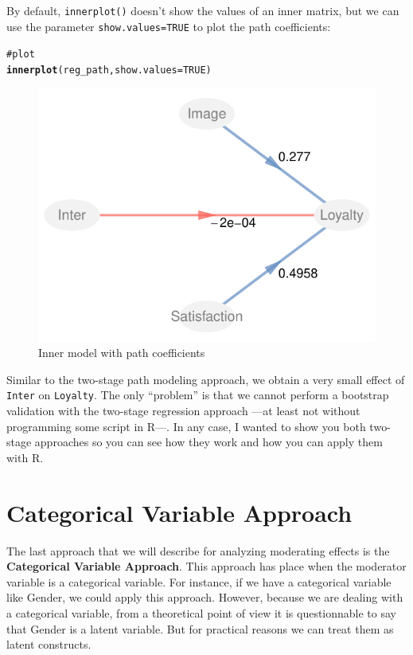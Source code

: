 \documentclass[12pt]{book}\usepackage{graphicx, color}
\makeatletter
\newcommand{\hlfunctioncall}[1]{\textcolor[rgb]{0.501960784313725,0,0.329411764705882}{\textbf{#1}}}%
\newcommand{\hlcomment}[1]{\textcolor[rgb]{0.180392156862745,0.6,0.341176470588235}{#1}}%
\newenvironment{kframe}{%
 \def\at@end@of@kframe{}%
 \ifinner\ifhmode%
  \def\at@end@of@kframe{\end{minipage}}%
  \begin{minipage}{\columnwidth}%
 \fi\fi%
 \def\FrameCommand##1{\hskip\@totalleftmargin \hskip-\fboxsep
 \colorbox{shadecolor}{##1}\hskip-\fboxsep
     \hskip-\linewidth \hskip-\@totalleftmargin \hskip\columnwidth}%
 \MakeFramed {\advance\hsize-\width
   \@totalleftmargin\z@ \linewidth\hsize
   \@setminipage}}%
 {\par\unskip\endMakeFramed%
 \at@end@of@kframe}
\newenvironment{knitrout}{}{} %
\newcommand{\code}[1]{\texttt{#1}}
\makeatother
\begin{document}
By default, \code{innerplot()} doesn't show the values of an inner matrix, but we can use the parameter \code{show.values=TRUE} to plot the path coefficients:
\begin{knitrout}
\color{fgcolor}\begin{kframe}
\begin{alltt}
\hlcomment{# plot}
\hlfunctioncall{innerplot}(reg_path, show.values = TRUE)
\end{alltt}
\end{kframe}\begin{figure}[h]


{\centering \includegraphics[width=.6\linewidth,height=.4\linewidth]{figure/TwoStageReg_path_diagram} 

}

\caption[Inner model with path coefficients]{Inner model with path coefficients\label{fig:TwoStageReg_path_diagram}}
\end{figure}


\end{knitrout}


Similar to the two-stage path modeling approach, we obtain a very small effect of \texttt{Inter} on \texttt{Loyalty}. The only ``problem'' is that we cannot perform a bootstrap validation with the two-stage regression approach ---at least not without programming some script in R---. In any case, I wanted to show you both two-stage approaches so you can see how they work and how you can apply them with R.




\section{Categorical Variable Approach}
The last approach that we will describe for analyzing moderating effects is the \textbf{Categorical Variable Approach}. This approach has place when the moderator variable is a categorical variable. For instance, if we have a categorical variable like Gender, we could apply this approach. However, because we are dealing with a categorical variable, from a theoretical point of view it is questionnable to say that Gender is a latent variable. But for practical reasons we can treat them as latent constructs. 
\end{document}
